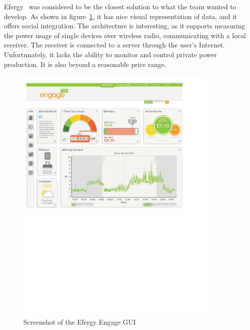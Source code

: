 Efergy~\cite{efergy} was considered to be the closest solution to what the team wanted to develop. As shown in figure~\ref{fig:efergyGUI}, it has nice visual representation of data, and it offers social integration. The architecture is interesting, as it supports measuring the power usage of single devices over wireless radio, communicating with a local receiver. The receiver is connected to a server through the user's Internet. Unfortunately, it lacks the ability to monitor and control private power production. It is also beyond a reasonable price range.

\begin{figure}[H]
\centering
\includegraphics[width=10cm, trim=0.5cm 12cm 3cm 0.7cm, clip]{ch/prestudy/fig/efergy.pdf}
\caption{Screenshot of the Efergy Engage GUI}
\label{fig:efergyGUI}
\end{figure}


